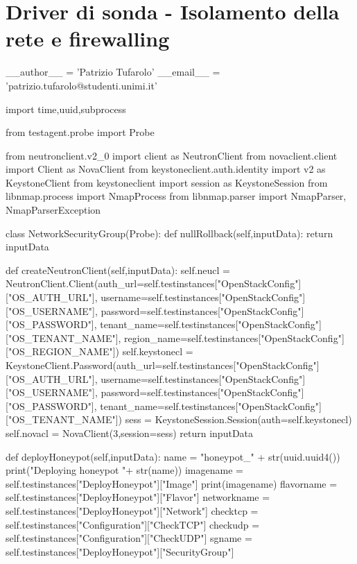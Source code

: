 \appendix
\thispagestyle{plain}

\iffalse

\chapter{Driver di sonda - Isolamento della rete e firewalling}
\begin{python}
__author__ = 'Patrizio Tufarolo'
__email__ = 'patrizio.tufarolo@studenti.unimi.it'


import time,uuid,subprocess

from testagent.probe import Probe

from neutronclient.v2_0 import client as NeutronClient
from novaclient.client import Client as NovaClient
from keystoneclient.auth.identity import v2 as KeystoneClient
from keystoneclient import session as KeystoneSession
from libnmap.process import NmapProcess
from libnmap.parser import NmapParser, NmapParserException

class NetworkSecurityGroup(Probe):
	def nullRollback(self,inputData):
		return inputData

	def createNeutronClient(self,inputData):
		self.neucl = NeutronClient.Client(auth_url=self.testinstances["OpenStackConfig"]["OS_AUTH_URL"],
						username=self.testinstances["OpenStackConfig"]["OS_USERNAME"],
						password=self.testinstances["OpenStackConfig"]["OS_PASSWORD"],
						tenant_name=self.testinstances["OpenStackConfig"]["OS_TENANT_NAME"],
						region_name=self.testinstances["OpenStackConfig"]["OS_REGION_NAME"])
		self.keystonecl = KeystoneClient.Password(auth_url=self.testinstances["OpenStackConfig"]["OS_AUTH_URL"],
						username=self.testinstances["OpenStackConfig"]["OS_USERNAME"],
						password=self.testinstances["OpenStackConfig"]["OS_PASSWORD"],
						tenant_name=self.testinstances["OpenStackConfig"]["OS_TENANT_NAME"])
		sess = KeystoneSession.Session(auth=self.keystonecl)
		self.novacl = NovaClient(3,session=sess)
		return inputData


	def deployHoneypot(self,inputData):
		name = "honeypot_" + str(uuid.uuid4())
		print("Deploying honeypot "+ str(name))
		imagename = self.testinstances["DeployHoneypot"]["Image"]
		print(imagename)
		flavorname = self.testinstances["DeployHoneypot"]["Flavor"]
		networkname = self.testinstances["DeployHoneypot"]["Network"]
		checktcp = self.testinstances["Configuration"]["CheckTCP"]
		checkudp = self.testinstances["Configuration"]["CheckUDP"]
		sgname = self.testinstances["DeployHoneypot"]["SecurityGroup"]


\end{python}
